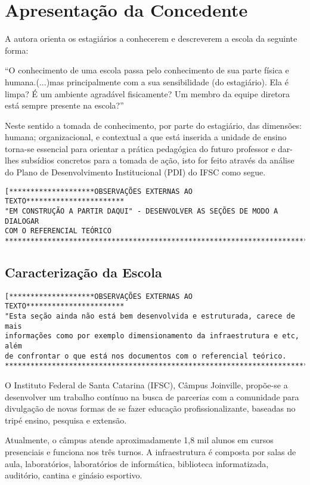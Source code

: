 \chapter{Apresentação da Concedente}
A autora  orienta os estagiários a conhecerem e descreverem a escola da seguinte forma:
\begin{citacao}
``O conhecimento de uma escola passa pelo conhecimento de sua parte física e humana.(...)mas principalmente com a sua sensibilidade (do estagiário). Ela é limpa? É um ambiente agradável fisicamente? Um membro da equipe diretora está sempre presente na escola?''\cite[p. 5]{CARVALHOAMP:2012a}
\end{citacao}
Neste sentido a tomada de conhecimento, por parte do estagiário, das dimensões: humana; organizacional, e contextual a que está inserida a unidade de ensino torna-se essencial para orientar a prática pedagógica do futuro professor e dar-lhes subsídios concretos para a tomada de ação, isto for feito através da análise do Plano de Desenvolvimento Institucional (PDI) do IFSC como segue.

\begin{verbatim}
[********************OBSERVAÇÕES EXTERNAS AO TEXTO***********************
"EM CONSTRUÇÃO A PARTIR DAQUI" - DESENVOLVER AS SEÇÕES DE MODO A DIALOGAR
COM O REFERENCIAL TEÓRICO
*************************************************************************]
\end{verbatim}

\section{Caracterização da Escola}
\begin{verbatim}
[********************OBSERVAÇÕES EXTERNAS AO TEXTO***********************
"Esta seção ainda não está bem desenvolvida e estruturada, carece de mais
informações como por exemplo dimensionamento da infraestrutura e etc, além
de confrontar o que está nos documentos com o referencial teórico.
*************************************************************************]
\end{verbatim}

O Instituto Federal de Santa Catarina (IFSC), Câmpus Joinville, propõe-se a desenvolver um trabalho contínuo na busca de parcerias com a comunidade para divulgação de novas formas de se fazer educação profissionalizante, baseadas no tripé ensino, pesquisa e extensão.

Atualmente, o câmpus atende aproximadamente 1,8 mil alunos em cursos presenciais e funciona nos três turnos. A infraestrutura é composta por salas de aula, laboratórios, laboratórios de informática, biblioteca informatizada, auditório, cantina e ginásio esportivo.




